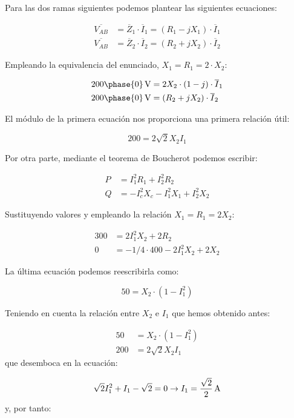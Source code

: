 \documentclass[12pt]{article}
\begin{document}
Para las dos ramas siguientes podemos plantear las siguientes ecuaciones:

\begin{align*}
  \overline{V_{AB}} &= \overline{Z}_1 \cdot \overline{I}_1 = (R_1 - jX_1) \cdot \overline{I}_1\\
  \overline{V_{AB}} &= \overline{Z}_2 \cdot \overline{I}_2 = (R_2 + jX_2) \cdot \overline{I}_2
\end{align*}

Empleando la equivalencia del enunciado, $X_1 = R_1 = 2 \cdot X_2$:

\begin{align*}
   \SI[parse-numbers=false]{200\phase{0}}{\volt} &=  2X_2\cdot (1 - j) \cdot \overline{I}_1\\
   \SI[parse-numbers=false]{200\phase{0}}{\volt} &= (R_2 + jX_2) \cdot \overline{I}_2
\end{align*}

El módulo de la primera ecuación nos proporciona una primera relación útil:

\[
 200 = 2\sqrt{2} X_2 I_1
\]

Por otra parte, mediante el teorema de Boucherot podemos escribir:

\begin{align*}
  P &= I_1^2 R_1 + I_2^2 R_2\\
  Q &= - I_c^2 X_c - I_1^2 X_1+ I_2^2X_2 
\end{align*}

Sustituyendo valores y empleando la relación $X_1 = R_1 = 2X_2$:

\begin{align*}
  300 &= 2I_1^2 X_2 + 2 R_2\\
  0 &= - 1/4 \cdot 400 - 2I_1^2X_2 + 2X_2 
\end{align*}

La última ecuación podemos reescribirla como:

\[
  50 = X_2 \cdot (1- I_1^2)
\]

Teniendo en cuenta la relación entre $X_2$ e $I_1$ que hemos obtenido antes:

\begin{align*}
  50 &= X_2 \cdot (1- I_1^2)\\
  200 &= 2\sqrt{2} X_2 I_1  
\end{align*}
que desemboca en la ecuación:

\[
\sqrt{2} I_1^2 + I_1 - \sqrt{2} = 0 \rightarrow I_1 =  \SI[parse-numbers=false]{\frac{\sqrt{2}}{2}}{\ampere}
\]
y, por tanto:
\end{document}
